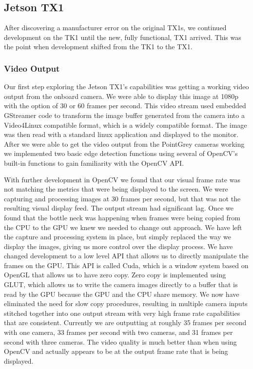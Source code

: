 \documentclass[letterpaper,10pt,titlepage]{IEEEtran}
\begin{document}
   \subsection{Jetson TX1}
   After discovering a manufacturer error on the original TX1s, we continued development on the TK1 until the new, fully functional, TX1 arrived. This was the point when development shifted from the TK1 to the TX1.\\ 
   
   \subsubsection{Video Output}
   Our first step exploring the Jetson TX1's capabilities was getting a working video output from the onboard camera. We were able to display this image at 1080p with the option of 30 or 60 frames per second. This video stream used embedded GStreamer code to transform the image buffer generated from the camera into a Video4Linux compatible format, which is a widely compatible format. The image was then read with a standard linux application and displayed to the monitor. After we were able to get the video output from the PointGrey cameras working we implemented two basic edge detection functions using several of OpenCV's built-in functions to gain familiarity with the OpenCV API.\\
   \par
   With further development in OpenCV we found that our visual frame rate was not matching the metrics that were being displayed to the screen. We were capturing and processing images at 30 frames per second, but that was not the resulting visual display feed. The output stream had significant lag. Once we found that the bottle neck was happening when frames were being copied from the CPU to the GPU we knew we needed to change out approach. We have left the capture and processing system in place, but simply replaced the way we display the images, giving us more control over the display process. We have changed development to a low level API that allows us to directly manipulate the frames on the GPU. This API is called Cuda, which is a window system based on OpenGL that allows us to have zero copy. Zero copy is implemented using GLUT, which allows us to write the camera images directly to a buffer that is read by the GPU because the GPU and the CPU share memory. We now have eliminated the need for slow copy procedures, resulting in multiple camera inputs stitched together into one output stream with very high frame rate capabilities that are consistent. Currently we are outputting at roughly 35 frames per second with one camera, 33 frames per second with two cameras, and 31 frames per second with three cameras. The video quality is much better than when using OpenCV and actually appears to be at the output frame rate that is being displayed.
   
\end{document}

